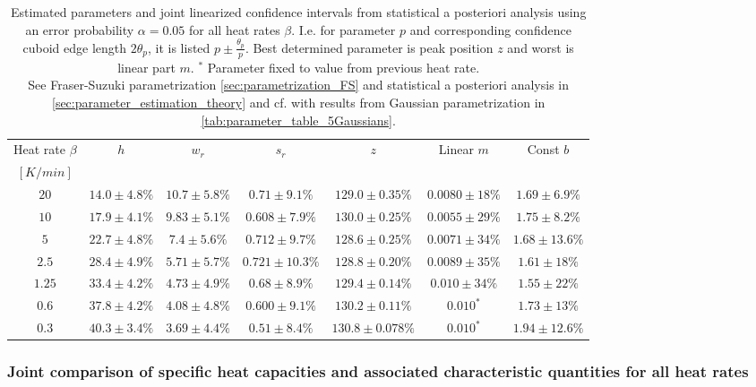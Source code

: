\documentclass{scrartcl}[12pt, halfparskip]
\numberwithin{equation}{section}
\numberwithin{figure}{section}
\numberwithin{table}{section}
\begin{document}
\begin{table}[H]
	\caption{Estimated parameters and joint linearized confidence intervals from statistical a posteriori analysis using an error probability $\alpha=0.05$ for all heat rates $\beta$. 
	I.e. for parameter $p$ and corresponding confidence cuboid edge length $2\theta_p$, it is listed $p \pm \frac{\theta_p}{p}$.
	Best determined parameter is  peak position $z$ and worst is linear part $m$.  $^*$ Parameter fixed to value from previous heat rate. \\
	See Fraser-Suzuki parametrization \cref{sec:parametrization_FS} and statistical a posteriori analysis in \cref{sec:parameter_estimation_theory} and cf. with results from Gaussian parametrization in \cref{tab:parameter_table_5Gaussians}.}
	\hspace{-1.6cm}
	\begin{tabular}{| c | c | c | c | c | c | c |} \hline
		Heat rate $\beta$ & $h$ & $w_r$ & $s_r$ & $z$ & Linear $m$ & Const $b$ \\ 
		$[K/min]$ & & & & & & \\ \hline
		$20$ & $14.0 \pm 4.8\%$ & $10.7 \pm 5.8\%$ & $0.71 \pm 9.1\%$ & $129.0 \pm 0.35\%$ & $0.0080 \pm 18\%$ & $1.69 \pm 6.9\%$ \\
		$10$ & $17.9 \pm 4.1\%$ & $9.83 \pm 5.1\%$ & $0.608 \pm 7.9\%$ & $130.0 \pm 0.25\%$ & $0.0055 \pm 29\%$ & $1.75 \pm 8.2\%$  \\
		$5$ & $22.7 \pm 4.8\%$ & $7.4 \pm 5.6\%$ & $0.712 \pm 9.7\%$ & $128.6 \pm 0.25\%$ & $0.0071 \pm 34\%$ & $1.68 \pm 13.6\%$ \\
		$2.5$ & $28.4 \pm 4.9\%$ & $5.71 \pm 5.7\%$ & $0.721 \pm 10.3\%$ & $128.8 \pm 0.20\%$ & $0.0089 \pm 35\%$ & $1.61 \pm 18\%$ \\
		$1.25$ & $33.4 \pm 4.2\%$ & $4.73 \pm 4.9\%$ & $0.68 \pm 8.9\%$ & $129.4 \pm 0.14\%$ & $0.010 \pm 34\%$ & $1.55 \pm 22\%$ \\
		$0.6$ & $37.8 \pm 4.2\%$ & $4.08 \pm 4.8\%$ & $0.600 \pm 9.1\%$ & $130.2 \pm 0.11\%$ & $0.010^*$ & $1.73 \pm 13\%$ \\
		$0.3$ & $40.3 \pm 3.4\%$ & $3.69 \pm 4.4\%$ & $0.51 \pm 8.4\%$ & $130.8 \pm 0.078\%$ & $0.010^*$ & $1.94 \pm 12.6\%$ \\ \hline
	\end{tabular}
	\label{tab:parameter_table_FS}
\end{table}

\subsubsection{Joint comparison of specific heat capacities and associated characteristic quantities for all heat rates}
\end{document}
